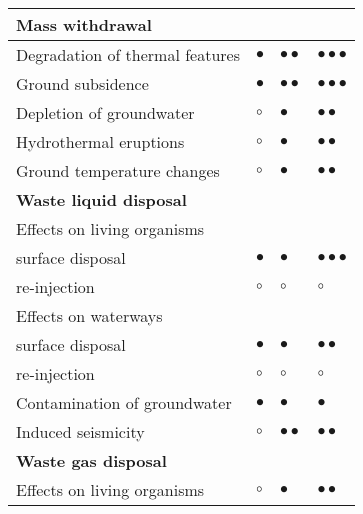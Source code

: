 \documentclass[12pts,a4paper,amsmath,amssymb,floatfix]{article}%
\begin{document}
\begin{enumerate}[label=\bfseries Problem \arabic*:]
\begin{table}[h]
\begin{center}
\begin{tabular}{l | l | l | l }
    \hline
    \multirow{1}{*}{\bf Mass withdrawal} \\
    \hline
    Degradation of thermal features    & $\bullet$            & $\bullet\bullet$             & $\bullet\bullet\bullet$ \\
    Ground subsidence                  & $\bullet$            & $\bullet\bullet$             & $\bullet\bullet\bullet$  \\
    Depletion of groundwater           & $\circ$              & $\bullet$                    & $\bullet\bullet$         \\
    Hydrothermal eruptions             & $\circ$              & $\bullet$                    & $\bullet\bullet$         \\
    Ground temperature changes         & $\circ$              & $\bullet$                    & $\bullet\bullet$         \\
    \hline
    \multirow{1}{*}{\bf Waste liquid disposal} \\
    \hline
    Effects on living organisms        &                      &                              &                         \\
    \;\;\;surface disposal             & $\bullet$            & $\bullet$                    & $\bullet\bullet\bullet$ \\
    \;\;\; re-injection                & $\circ$              & $\circ$                      & $\circ$                 \\
    Effects on waterways               &                      &                              &                         \\
    \;\;\;surface disposal             & $\bullet$            & $\bullet$                    & $\bullet\bullet$        \\
    \;\;\; re-injection                & $\circ$              & $\circ$                      & $\circ$                 \\
    Contamination of groundwater       & $\bullet$            & $\bullet$                    & $\bullet$               \\
    Induced seismicity                 & $\circ$              & $\bullet\bullet$             & $\bullet\bullet$        \\
    \hline
    \multirow{1}{*}{\bf Waste gas disposal} \\
    \hline
    Effects on living organisms        & $\circ$              & $\bullet$                    & $\bullet\bullet$         \\

\end{tabular}
\end{center}
\end{table}
\end{enumerate}
\end{document}

